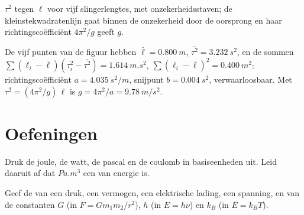 \begin{omfigure}

{\small $\tau^2$ tegen $\ell$ voor vijf slingerlengtes, met
onzekerheidsstaven; de kleinstekwadratenlijn gaat binnen de onzekerheid door
de oorsprong en haar richtingscoëfficiënt $4\pi^2/g$ geeft $g$.}
\end{omfigure}

\begin{example}\label{ex:b1:units-dimensions:slope}
De vijf punten van de figuur hebben $\bar\ell = \qty{0.800}{m}$,
$\overline{\tau^2} = \qty{3.232}{s^2}$, en de sommen
$\sum (\ell_i - \bar\ell)(\tau_i^2 - \overline{\tau^2}) = \qty{1.614}{m.s^2}$,
$\sum (\ell_i - \bar\ell)^2 = \qty{0.400}{m^2}$: richtingscoëfficiënt
$a = \qty{4.035}{s^2/m}$, snijpunt $b = \qty{0.004}{s^2}$, verwaarloosbaar. Met
$\tau^2 = (4\pi^2/g)\,\ell$ is $g = 4\pi^2/a = \qty{9.78}{m/s^2}$.
\end{example}

\section{Oefeningen}

\begin{exercise}[$\star$]\label{exo:b1:units-dimensions:1}
Druk de joule, de watt, de pascal en de coulomb in basiseenheden uit.
Leid daaruit af dat $\unit{Pa.m^3}$ een  van energie is.
\end{exercise}

\begin{exercise}[$\star$]\label{exo:b1:units-dimensions:2}
Geef de  van een druk, een vermogen, een elektrische lading, een
spanning, en van de constanten $G$ (in $F = Gm_1m_2/r^2$), $h$ (in
$E = h\nu$) en $k_B$ (in $E = k_B T$).
\end{exercise}

